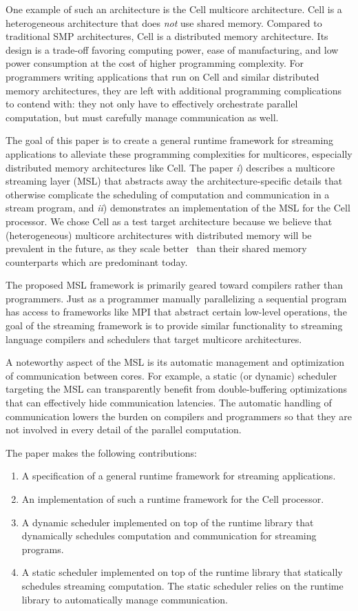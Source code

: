 One example of such an architecture is the Cell multicore
architecture. Cell is a heterogeneous architecture that does
\emph{not} use shared memory. Compared to traditional SMP
architectures, Cell is a distributed memory architecture. Its design
is a trade-off favoring computing power, ease of manufacturing, and
low power consumption at the cost of higher programming
complexity. For programmers writing applications that run on Cell and
similar distributed memory architectures, they are left with
additional programming complications to contend with: they not only
have to effectively orchestrate parallel computation, but must
carefully manage communication as well.

The goal of this paper is to create a general runtime framework for
streaming applications to alleviate these programming complexities for
multicores, especially distributed memory architectures like Cell. The
paper \emph{i}) describes a multicore streaming layer (MSL) that abstracts
away the architecture-specific details that otherwise complicate the
scheduling of computation and communication in a stream program, and
\emph{ii}) demonstrates an implementation of the MSL for the Cell
processor. We chose Cell as a test target architecture because we
believe that (heterogeneous) multicore architectures with distributed
memory will be prevalent in the future, as they scale
better~\cite{theo-phd-07} than their shared memory counterparts which
are predominant today.

The proposed MSL framework is primarily geared toward compilers rather
than programmers. Just as a programmer manually parallelizing a
sequential program has access to frameworks like MPI that abstract
certain low-level operations, the goal of the streaming framework is
to provide similar functionality to streaming language compilers and
schedulers that target multicore architectures. 

A noteworthy aspect of the MSL is its automatic management and
optimization of communication between cores. For example, a static (or
dynamic) scheduler targeting the MSL can transparently benefit from
double-buffering optimizations that can effectively hide communication
latencies. The automatic handling of communication lowers the burden
on compilers and programmers so that they are not involved in every
detail of the parallel computation.

The paper makes the following contributions:
\begin{enumerate}
\item A specification of a general runtime framework for streaming applications.
\item An implementation of such a runtime framework for the Cell processor.
\item A dynamic scheduler implemented on top of the runtime library
  that dynamically schedules computation and communication for
  streaming programs.
\item A static scheduler implemented on top of the runtime library
  that statically schedules streaming computation. The static
  scheduler relies on the runtime library to automatically manage
  communication.
\end{enumerate}

